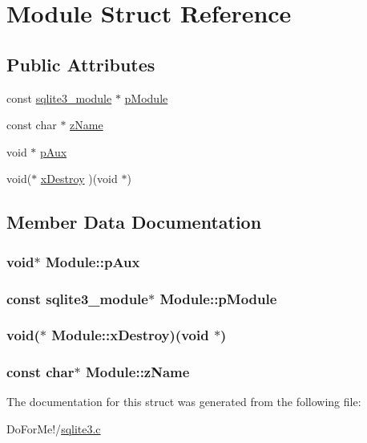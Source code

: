 \hypertarget{struct_module}{\section{Module Struct Reference}
\label{struct_module}
}
\subsection*{Public Attributes}
\begin{DoxyCompactItemize}
\item 
const \hyperlink{structsqlite3__module}{sqlite3\-\_\-module} $\ast$ \hyperlink{struct_module_a65d2539d71ea028b505b2fb33563bfd7}{p\-Module}
\item 
const char $\ast$ \hyperlink{struct_module_a45a5f5b43926b8ebf3e13e46a6534810}{z\-Name}
\item 
void $\ast$ \hyperlink{struct_module_ae3b827fee4c8b4f3ff38c86c2e2f48cd}{p\-Aux}
\item 
void($\ast$ \hyperlink{struct_module_a4be509110a1a2f2c06a5d69af45704ca}{x\-Destroy} )(void $\ast$)
\end{DoxyCompactItemize}


\subsection{Member Data Documentation}
\hypertarget{struct_module_ae3b827fee4c8b4f3ff38c86c2e2f48cd}{
\subsubsection[{p\-Aux}]{\setlength{\rightskip}{0pt plus 5cm}void$\ast$ Module\-::p\-Aux}}\label{struct_module_ae3b827fee4c8b4f3ff38c86c2e2f48cd}
\hypertarget{struct_module_a65d2539d71ea028b505b2fb33563bfd7}{
\subsubsection[{p\-Module}]{\setlength{\rightskip}{0pt plus 5cm}const {\bf sqlite3\-\_\-module}$\ast$ Module\-::p\-Module}}\label{struct_module_a65d2539d71ea028b505b2fb33563bfd7}
\hypertarget{struct_module_a4be509110a1a2f2c06a5d69af45704ca}{
\subsubsection[{x\-Destroy}]{\setlength{\rightskip}{0pt plus 5cm}void($\ast$ Module\-::x\-Destroy)(void $\ast$)}}\label{struct_module_a4be509110a1a2f2c06a5d69af45704ca}
\hypertarget{struct_module_a45a5f5b43926b8ebf3e13e46a6534810}{
\subsubsection[{z\-Name}]{\setlength{\rightskip}{0pt plus 5cm}const char$\ast$ Module\-::z\-Name}}\label{struct_module_a45a5f5b43926b8ebf3e13e46a6534810}


The documentation for this struct was generated from the following file\-:\begin{DoxyCompactItemize}
\item 
Do\-For\-Me!/\hyperlink{sqlite3_8c}{sqlite3.\-c}\end{DoxyCompactItemize}
